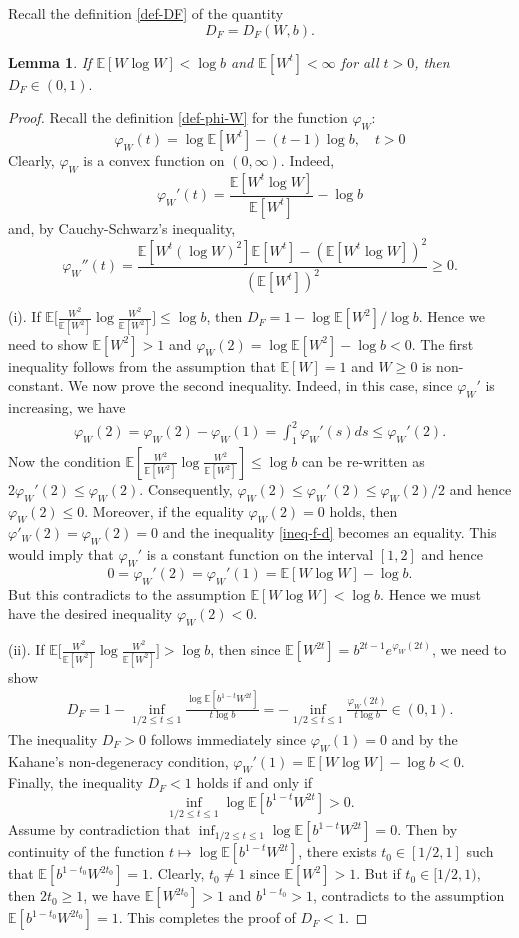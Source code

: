 \documentclass[12pt]{amsart}
\newtheorem{lemma}[theorem]{Lemma}
\theoremstyle{definition}
\theoremstyle{remark}
\newcommand{\E}{\mathbb{E}}
\numberwithin{equation}{section}
\begin{document}
Recall the definition  \eqref{def-DF} of the quantity 
\[
D_F= D_F(W,b).
\]
\begin{lemma}\label{lem-DF}
If $\E[W\log W]<\log b$ and $\E[W^t]<\infty$ for all $t>0$, then 
 $
 D_F\in (0,1).
 $ 
\end{lemma}
\begin{proof}
Recall the definition \eqref{def-phi-W} for the function $\varphi_W$: 
\[
\varphi_W(t) = \log \E[W^t] - (t-1) \log b, \quad t>0
\]
Clearly,  $\varphi_W$ is a convex function on $(0, \infty)$. Indeed, 
\[
\varphi_W'(t)=\frac{\E[W^{t}\log W]}{\E[W^{t}]} - \log b
\]
and, by Cauchy-Schwarz's inequality, 
\[
 \varphi_W''(t)=\frac{\E[W^{t}(\log W)^2]\E[W^{t}]-(\E[W^{t}\log W])^2}{(\E[W^{t}])^2}\ge 0.  
\]


(i).  If  $\E\big[ \frac{W^2}{\E[W^2]} \log \frac{W^2}{\E[W^2]}\big] \le \log b$, then $D_F = 1- \log \E[W^2]/\log b$. Hence we need to show  $\E[W^2]> 1$ and  $\varphi_W(2) = \log \E[W^2] - \log b <0$.  The first inequality follows from the assumption that $\E[W]=1$ and $W\ge 0$ is non-constant. We  now prove the second inequality.  Indeed, in this case,  since $\varphi_W'$ is increasing,  we have 
\begin{align}\label{ineq-f-d}
\varphi_W(2)=  \varphi_W(2)-\varphi_W(1) = \int_1^2 \varphi_W'(s)ds \le    \varphi_W'(2).
\end{align}
Now the condition $\E[ \frac{W^2}{\E[W^2]} \log \frac{W^2}{\E[W^2]}] \le \log b$ can be re-written as  
$
2 \varphi_W'(2)  \le \varphi_W(2).
$
Consequently,  $\varphi_W(2)\le \varphi_W'(2) \le \varphi_W(2)/2$ and hence $\varphi_W(2)\le 0$.  Moreover, if the equality $\varphi_W(2)=0$ holds, then  $\varphi'_W(2) = \varphi_W(2) =0$ and the inequality \eqref{ineq-f-d} becomes an equality. This would  imply that $\varphi_W'$ is a constant function on the interval $[1, 2]$ and hence
\[
0 =  \varphi_W'(2)= \varphi_W'(1)= \E[W\log W]-\log b.
\]
But this contradicts to the assumption $\E[W\log W]<\log b$. Hence we must have the desired inequality $\varphi_W(2)<0$. 


(ii).  If  $\E\big[ \frac{W^2}{\E[W^2]} \log \frac{W^2}{\E[W^2]}\big] >  \log b$, then since $\E[W^{2t}]  = b^{2t-1} e^{\varphi_W(2t)}$, we need to show 
\begin{align}\label{F-pos-proof}
D_F= 1  -   \inf_{1/2\le t\le 1} \frac{\log  \E[b^{1-t}W^{2t}]}{ t \log b}  =  - \inf_{1/2\le t\le 1}   \frac{ \varphi_W(2t)}{t\log b} \in (0,1). 
\end{align}
The inequality $D_F>0$ follows immediately since $\varphi_W(1) =0$ and by the Kahane's non-degeneracy condition, 
$
\varphi_W'(1)= \E[W\log W]-\log b <0. 
$ Finally,  the inequality $D_F<1$ holds if and only if 
\[
\inf_{1/2\le t\le 1 } \log \E[b^{1-t} W^{2t}]> 0. 
\]
Assume by contradiction that $\inf_{1/2\le t\le 1 } \log \E[b^{1-t} W^{2t}]=0$. Then by continuity of the function $t\mapsto \log \E[b^{1-t} W^{2t}]$, there exists $t_0\in [1/2, 1]$ such that 
$
 \E[b^{1-t_0} W^{2t_0}] = 1$. Clearly, $t_0\ne 1$ since $\E[W^2]>1$. But if $t_0\in [1/2, 1)$, then  $2t_0\ge 1$, we have $\E[W^{2t_0}] >1$ and $b^{1-t_0}>1$, contradicts to the assumption  $\E[b^{1-t_0} W^{2t_0}]=1$. This completes the proof of $D_F<1$. 
\end{proof}
\end{document}
